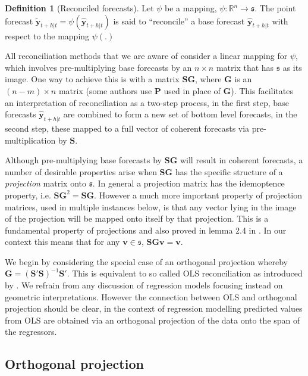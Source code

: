 \documentclass[12pt]{article}
\theoremstyle{definition}
\newtheorem{definition}{Definition}[section]
\theoremstyle{property}
\begin{document}
	\begin{definition}[Reconciled forecasts]\label{def:reconpoint}
		Let $\psi$ be a mapping, $\psi:\mathbb{R}^n\rightarrow\mathfrak{s}$.  The point forecast $\tilde{\bm{y}}_{t+h|t}=\psi\left(\hat{\bm{y}}_{t+h|t}\right)$ is said to ``reconcile'' a base forecast $\hat{\bm{y}}_{t+h|t}$ with respect to the mapping $\psi(.)$
	\end{definition}
	
	All reconciliation methods that we are aware of consider a linear mapping for $\psi$, which involves pre-multiplying base forecasts by an $n\times n$ matrix that has $\mathfrak{s}$ as its image.  One way to achieve this is with a matrix $\bm{SG}$, where $\bm{G}$ is an $(n-m)\times n$ matrix  (some authors use $\bm{P}$ used in place of $\bm{G}$).  This facilitates an interpretation of reconciliation as a two-step process, in the first step, base forecasts $\hat{\bm{y}}_{t+h|t}$ are combined to form a new set of bottom level forecasts, in the second step, these mapped to a full vector of coherent forecasts via pre-multiplication by $\bm{S}$.  
	
	Although pre-multiplying base forecasts by $\bm{SG}$ will result in coherent forecasts, a number of desirable properties arise when $\bm{SG}$ has the specific structure of a {\em projection} matrix onto $\mathfrak{s}$.  In general a projection matrix has the idemoptence property, i.e. $\bm{SG}^2=\bm{SG}$.  However a much more important property of projection matrices, used in multiple instances below, is that any vector lying in the image of the projection will be mapped onto itself by that projection. This is a fundamental property of projections and also proved in lemma 2.4 in \citet{rao1974}. In our context this means that for any $\bm{v}\in\mathfrak{s}$, $\bm{SGv}=\bm{v}$.
	
	We begin by considering the special case of an orthogonal projection whereby $\bm{G}=\left(\bm{S}'\bm{S}\right)^{-1}\bm{S}'$.  This is equivalent to so called OLS reconciliation as introduced by \cite{Hyndman2011}.  We refrain from any discussion of regression models focusing instead on geometric interpretations.  However the connection between OLS and orthogonal projection should be clear, in the context of regression modelling predicted values from OLS are obtained via an orthogonal projection of the data onto the span of the regressors.
	
	\subsection{Orthogonal projection}
	
\end{document}
